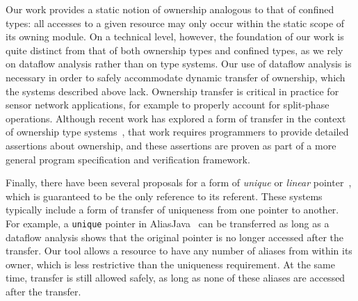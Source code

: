 Our work provides a static notion of ownership analogous to that of
confined types:  all accesses to a given resource may only occur
within the static scope of its owning module.  On a technical level,
however, the foundation of our work is quite distinct from that of
both ownership types and confined types, as we rely on dataflow
analysis rather than on type systems.  Our use of dataflow analysis is
necessary in order to safely accommodate dynamic transfer of
ownership, which the systems described above lack.  Ownership transfer
is critical in practice for sensor network applications, for example
to properly account for split-phase operations.  Although recent work
has explored a form of transfer in the context of ownership type
systems~\cite{DBLP:conf/ecoop/BanerjeeN05}, that work requires
programmers to provide detailed assertions about ownership, and these
assertions are proven as part of a more general program specification
and verification framework.


Finally, there have been several proposals for a form of {\em unique}
or {\em linear}
pointer~\cite{Boyland:2001:ABU,aliasjava,Wad90:linear,adoption-focus},
which is guaranteed to be the only reference to its referent.  These
systems typically include a form of transfer of uniqueness from one
pointer to another.  For example, a {\tt unique} pointer in
AliasJava~\cite{aliasjava} can be transferred as long as a dataflow
analysis shows that the original pointer is no longer accessed after
the transfer.  Our tool allows a resource to have any number of
aliases from within its owner, which is less restrictive than the
uniqueness requirement.  At the same time, transfer is still allowed
safely, as long as none of these aliases are accessed after the
transfer.

